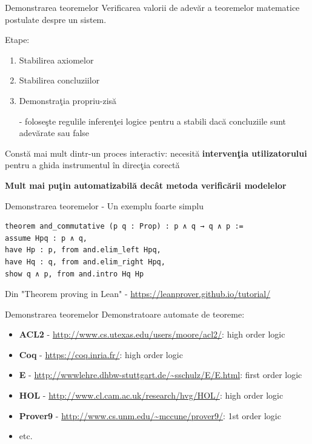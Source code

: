 \documentclass{beamer}
\begin{document}
\begin{frame}{Demonstrarea teoremelor}
Verificarea valorii de adevăr a teoremelor matematice postulate despre un sistem. 

\vspace{0.5cm}

Etape:
\begin{enumerate}
\item
Stabilirea axiomelor
\item
Stabilirea concluziilor
\item
Demonstraţia propriu-zisă

- foloseşte regulile inferenţei logice pentru a stabili dacă concluziile sunt adevărate sau false
\end{enumerate}

\vspace{0.5cm}

Constă mai mult dintr-un proces interactiv: necesită \textbf{intervenţia utilizatorului} pentru a ghida instrumentul în direcţia corectă

\vspace{0.5cm}

\textbf{Mult mai puţin automatizabilă decât metoda verificării modelelor}
\end{frame}



\begin{frame}[fragile]{Demonstrarea teoremelor - Un exemplu foarte simplu}
\begin{verbatim}
theorem and_commutative (p q : Prop) : p ∧ q → q ∧ p :=
assume Hpq : p ∧ q,
have Hp : p, from and.elim_left Hpq,
have Hq : q, from and.elim_right Hpq,
show q ∧ p, from and.intro Hq Hp
\end{verbatim}

Din "Theorem proving in Lean" - \url{https://leanprover.github.io/tutorial/}
\end{frame}



\begin{frame}{Demonstrarea teoremelor}
Demonstratoare automate de teoreme:

\begin{itemize}
\item
\textbf{ACL2} - \url{http://www.cs.utexas.edu/users/moore/acl2/}: high order logic
\item
\textbf{Coq} - \url{https://coq.inria.fr/}: high order logic
\item
\textbf{E} - \url{http://wwwlehre.dhbw-stuttgart.de/~sschulz/E/E.html}: first order logic
\item
\textbf{HOL} - \url{http://www.cl.cam.ac.uk/research/hvg/HOL/}: high order logic
\item
\textbf{Prover9} - \url{http://www.cs.unm.edu/~mccune/prover9/}: 1st order logic
\item
etc.
\end{itemize}
\end{frame}
\end{document}
